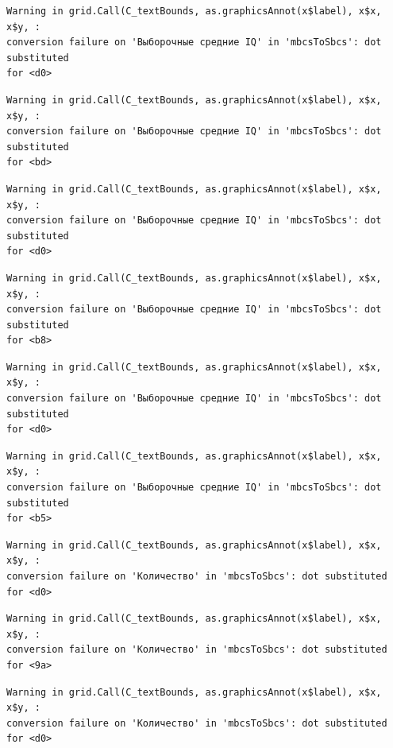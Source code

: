 \documentclass[
  letterpaper,
  DIV=11,
  numbers=noendperiod]{scrreprt}
\theoremstyle{definition}
\theoremstyle{remark}
\begin{document}
\begin{verbatim}
Warning in grid.Call(C_textBounds, as.graphicsAnnot(x$label), x$x, x$y, :
conversion failure on 'Выборочные средние IQ' in 'mbcsToSbcs': dot substituted
for <d0>
\end{verbatim}

\begin{verbatim}
Warning in grid.Call(C_textBounds, as.graphicsAnnot(x$label), x$x, x$y, :
conversion failure on 'Выборочные средние IQ' in 'mbcsToSbcs': dot substituted
for <bd>
\end{verbatim}

\begin{verbatim}
Warning in grid.Call(C_textBounds, as.graphicsAnnot(x$label), x$x, x$y, :
conversion failure on 'Выборочные средние IQ' in 'mbcsToSbcs': dot substituted
for <d0>
\end{verbatim}

\begin{verbatim}
Warning in grid.Call(C_textBounds, as.graphicsAnnot(x$label), x$x, x$y, :
conversion failure on 'Выборочные средние IQ' in 'mbcsToSbcs': dot substituted
for <b8>
\end{verbatim}

\begin{verbatim}
Warning in grid.Call(C_textBounds, as.graphicsAnnot(x$label), x$x, x$y, :
conversion failure on 'Выборочные средние IQ' in 'mbcsToSbcs': dot substituted
for <d0>
\end{verbatim}

\begin{verbatim}
Warning in grid.Call(C_textBounds, as.graphicsAnnot(x$label), x$x, x$y, :
conversion failure on 'Выборочные средние IQ' in 'mbcsToSbcs': dot substituted
for <b5>
\end{verbatim}

\begin{verbatim}
Warning in grid.Call(C_textBounds, as.graphicsAnnot(x$label), x$x, x$y, :
conversion failure on 'Количество' in 'mbcsToSbcs': dot substituted for <d0>
\end{verbatim}

\begin{verbatim}
Warning in grid.Call(C_textBounds, as.graphicsAnnot(x$label), x$x, x$y, :
conversion failure on 'Количество' in 'mbcsToSbcs': dot substituted for <9a>
\end{verbatim}

\begin{verbatim}
Warning in grid.Call(C_textBounds, as.graphicsAnnot(x$label), x$x, x$y, :
conversion failure on 'Количество' in 'mbcsToSbcs': dot substituted for <d0>
\end{verbatim}
\end{document}

